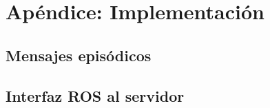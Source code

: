 \chapter{Apéndice: Implementación}\label{chapter:appendix_b}

\section{Mensajes episódicos}

\lstset{style=/Style/ROS/MSG}










\section{Interfaz ROS al servidor}

\lstset{style=/Style/ROS/MSG}



